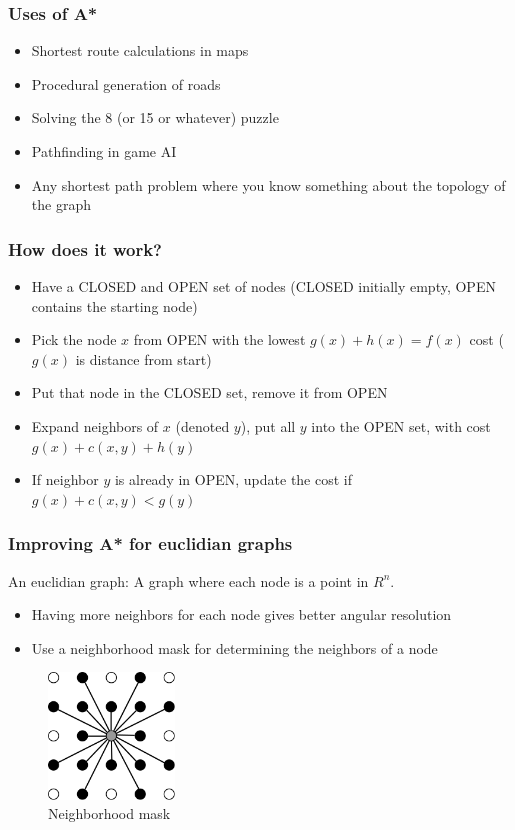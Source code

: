 \begin{frame}
\frametitle{Uses of A*}
\begin{itemize}
\item Shortest route calculations in maps
\item Procedural generation of roads
\item Solving the 8 (or 15 or whatever) puzzle
\item Pathfinding in game AI
\item Any shortest path problem where you know something about the topology of the graph
\end{itemize}
\end{frame}

\begin{frame}
\frametitle{How does it work?}
\begin{itemize}
\item Have a CLOSED and OPEN set of nodes (CLOSED initially empty, OPEN contains the starting node)
\item Pick the node $x$ from OPEN with the lowest $g(x)+h(x)=f(x)$ cost ($g(x)$ is distance from start)
\item Put that node in the CLOSED set, remove it from OPEN
\item Expand neighbors of $x$ (denoted $y$), put all $y$ into the OPEN set, with cost $g(x)+c(x,y)+h(y)$
\item If neighbor $y$ is already in OPEN, update the cost if $g(x)+c(x,y) < g(y)$
\end{itemize}
\end{frame}

\begin{frame}
\frametitle{Improving A* for euclidian graphs}
An euclidian graph: A graph where each node is a point in $R^n$.
\begin{itemize}
\item Having more neighbors for each node gives better angular resolution
\item Use a neighborhood mask for determining the neighbors of a node
\end{itemize}

\begin{figure}[ht]
\includegraphics[width=0.3\textwidth]{gfx/neighbormask}
\caption{Neighborhood mask}
\label{fig:}
\end{figure}
\end{frame}

